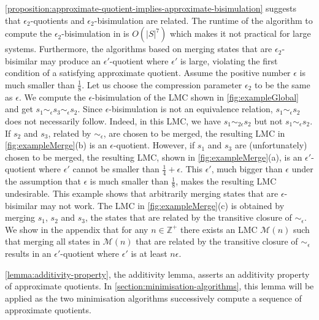 \documentclass[a4paper,UKenglish,cleveref,autoref,thm-restate]{lipics-v2021}
\newcommand{\integer}{\mathbb{Z}}
\newcommand{\M}{\mathcal{M}}
\begin{document}
\cref{proposition:approximate-quotient-implies-approximate-bisimulation} suggests that $\epsilon_2$-quotients and $\epsilon_2$-bisimulation are related.  The runtime of the algorithm to compute the $\epsilon_2$-bisimulation in \cite{DesharnaisLavoletteTracol2008} is $O(|S|^7)$ which makes it not practical for large systems. Furthermore, the algorithms based on merging states that are $\epsilon_2$-bisimilar may produce an $\epsilon'$-quotient where $\epsilon'$ is large, violating the first condition of a satisfying approximate quotient. Assume the positive number $\epsilon$ is much smaller than $\frac{1}{8}$. Let us choose the compression parameter $\epsilon_2$ to be the same as $\epsilon$. We compute the $\epsilon$-bisimulation of the LMC shown in \cref{fig:exampleGlobal} and get $s_1 \sim_{\epsilon} s_3 \sim_{\epsilon} s_2$.  Since $\epsilon$-bisimulation is not an equivalence relation, $s_1  \sim_{\epsilon} s_2$ does not necessarily follow. Indeed, in this LMC, we have $s_1  \sim_{2\epsilon} s_2$ but not $s_1  \sim_{\epsilon} s_2$. If $s_2$ and $s_3$, related by $\sim_{\epsilon}$, are chosen to be merged, the resulting LMC in \cref{fig:exampleMerge}(b) is an $\epsilon$-quotient. However, if $s_1$ and $s_3$ are (unfortunately) chosen to be merged, the resulting LMC, shown in \cref{fig:exampleMerge}(a), is an $\epsilon'$-quotient where $\epsilon'$ cannot be smaller than $\frac{1}{4}+\epsilon$. This $\epsilon'$, much bigger than $\epsilon$ under the assumption that $\epsilon$ is much smaller than $\frac{1}{8}$, makes the resulting LMC undesirable. This example shows that arbitrarily merging states that are $\epsilon$-bisimilar may not work. The LMC in \cref{fig:exampleMerge}(c) is obtained by merging $s_1$, $s_2$ and $s_3$, the states that are related by the transitive closure of $\sim_{\epsilon}$. We show in the appendix that for any $n \in \integer^{+}$ there exists an LMC $\M(n)$ such that merging all states in $\M(n)$  that are related by the transitive closure of $\sim_{\epsilon}$ results in an $\epsilon'$-quotient where $\epsilon'$ is at least $n\epsilon$.




\cref{lemma:additivity-property}, the additivity lemma, asserts an additivity property of approximate quotients. In \cref{section:minimisation-algorithms}, this lemma will be applied as the two minimisation algorithms successively compute a sequence of approximate quotients.
\end{document}
